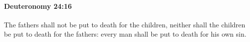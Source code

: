 
		\paragraph{Deuteronomy 24:16} %
			\label{DEUTERONOMY-24-16}

			The fathers shall not be put to death for the children, neither shall the children be put to death for the fathers: every man shall be put to death for his own sin.


